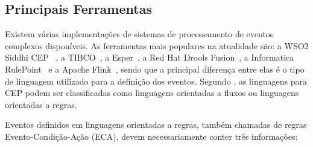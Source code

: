 




\subsection{Principais Ferramentas}
\label{sec:mainsoftwares}

Existem várias implementações de sistemas de processamento de eventos complexos disponíveis. As ferramentas mais populares na atualidade são: a WSO2 Siddhi CEP ~\citep{WSO2}, a TIBCO~\citep{TIBCO},  a Esper~\citep{ESPER}, a Red Hat Drools Fusion~\citep{DroolsFusion}, a Informatica RulePoint~\citep{Informatica} e a Apache Flink~\citep{Flink}, sendo que a principal diferença entre elas é o tipo de linguagem utilizado para a definição dos eventos. Segundo \cite{Margara:2011:PFI:2002259.2002307}, as linguagens para CEP podem ser classificadas como linguagens orientadas a fluxos ou linguagens orientadas a regras. 

Eventos definidos em linguagens orientadas a regras, também chamadas de regras Evento-Condição-Ação (ECA), devem necessariamente conter três informações:

